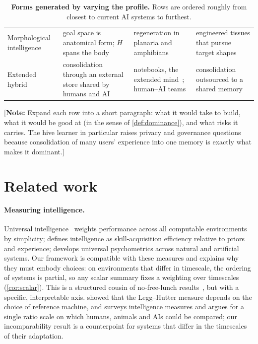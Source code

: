 \documentclass[11pt]{article}
\newcommand{\note}[1]{\textcolor{notecolor}{\small[\textbf{Note:} #1]}}
\theoremstyle{plain}
\theoremstyle{definition}
\theoremstyle{remark}
\begin{document}
\begin{table}[t]
\begin{tabularx}{\linewidth}{@{}>{\raggedright}p{2.6cm}>{\raggedright}p{3.6cm}>{\raggedright}p{3.4cm}>{\raggedright\arraybackslash}X@{}}
Morphological intelligence & goal space is anatomical form; $H$ spans the body & regeneration in planaria and amphibians~\citep{levin2022tame} & engineered tissues that pursue target shapes \\
Extended hybrid & consolidation through an external store shared by humans and AI & notebooks, the extended mind~\citep{clark1998extended}; human--AI teams & consolidation outsourced to a shared memory \\
\bottomrule
\end{tabularx}
\caption{\textbf{Forms generated by varying the profile.} Rows are ordered roughly from closest to current AI systems to furthest.}
\label{tab:forms}
\end{table}

\note{Expand each row into a short paragraph: what it would take to build, what it would be good at (in the sense of \cref{def:dominance}), and what risks it carries. The hive learner in particular raises privacy and governance questions because consolidation of many users' experience into one memory is exactly what makes it dominant.}

\section{Related work}
\label{sec:related}

\paragraph{Measuring intelligence.}
Universal intelligence~\citep{legg2007universal} weights performance across all computable environments by simplicity; \citet{chollet2019measure} defines intelligence as skill-acquisition efficiency relative to priors and experience; \citet{hernandez2017measure} develops universal psychometrics across natural and artificial systems. Our framework is compatible with these measures and explains why they must embody choices: on environments that differ in timescale, the ordering of systems is partial, so any scalar summary fixes a weighting over timescales (\cref{cor:scalar}). This is a structured cousin of no-free-lunch results~\citep{wolpert1997no}, but with a specific, interpretable axis. \citet{leike2015bad} showed that the Legg--Hutter measure depends on the choice of reference machine, and \citet{gamez2026taxonomy} surveys intelligence measures and argues for a single ratio scale on which humans, animals and AIs could be compared; our incomparability result is a counterpoint for systems that differ in the timescales of their adaptation.
\end{document}
